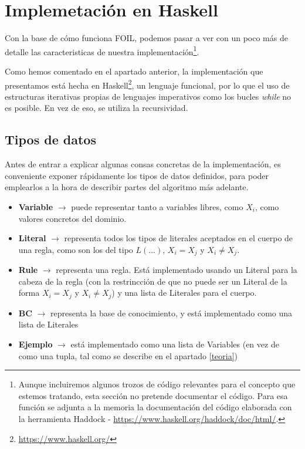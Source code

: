 \section{Implemetación en Haskell}
Con la base de cómo funciona FOIL, podemos pasar a ver con un poco más de detalle las caracteristicas de nuestra implementación\footnote{Aunque incluiremos algunos trozos de código relevantes para el concepto que estemos tratando, esta sección no pretende documentar el código. Para esa función se adjunta a la memoria la documentación del código elaborada con la herramienta Haddock - \url{https://www.haskell.org/haddock/doc/html/}.}.

Como hemos comentado en el apartado anterior, la implementación que presentamos está hecha en Haskell\footnote{\url{https://www.haskell.org/}}, un lenguaje funcional, por lo que el uso de estructuras iterativas propias de lenguajes imperativos como los bucles \emph{while} no es posible. En vez de eso, se utiliza la recursividad.

\subsection{Tipos de datos}
Antes de entrar a explicar algunas consas concretas de la implementación, es conveniente exponer rápidamente los tipos de datos definidos, para poder emplearlos a la hora de describir partes del algoritmo más adelante.

\begin{itemize}
  \item \textbf{Variable} $\rightarrow$ puede representar tanto a variables libres, como $X_{i}$, como valores concretos del dominio. 
  \item \textbf{Literal} $\rightarrow$ representa todos los tipos de literales aceptados en el cuerpo de una regla, como son los del tipo $L(...)$, $X_{i} = X_{j}$ y $X_{i} \neq X_{j}$.
  \item \textbf{Rule} $\rightarrow$ representa una regla. Está implementado usando un Literal para la cabeza de la regla (con la restrincción de que no puede ser un Literal de la forma $X_{i} = X_{j}$ y $X_{i} \neq X_{j}$) y una lista de Literales para el cuerpo.
  \item \textbf{BC} $\rightarrow$ representa la base de conocimiento, y está implementado como una lista de Literales
  \item \textbf{Ejemplo} $\rightarrow$ está implementado como una lista de Variables (en vez de como una tupla, tal como se describe en el apartado \ref{teoria})
\end{itemize}

